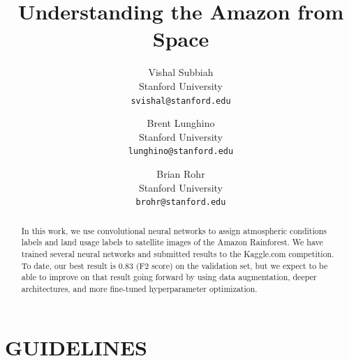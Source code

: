 \documentclass[10pt,twocolumn,letterpaper]{article}
\begin{document}
\title{Understanding the Amazon from Space}

\author{Vishal Subbiah\\
Stanford University\\
{\tt\small svishal@stanford.edu}
\and
Brent Lunghino\\
Stanford University\\
{\tt\small lunghino@stanford.edu}
\and
Brian Rohr\\
Stanford University\\
{\tt\small brohr@stanford.edu}
}

\maketitle

\begin{abstract}
   In this work, we use convolutional neural networks to assign atmospheric conditions labels and land usage labels to satellite images of the Amazon Rainforest. We have trained several neural networks and submitted results to the Kaggle.com competition. To date, our best result is 0.83 (F2 score) on the validation set, but we expect to be able to improve on that result going forward by using data augmentation, deeper architectures, and more fine-tuned hyperparameter optimization.
\end{abstract}


\iffalse
\section{GUIDELINES}
\end{document}
